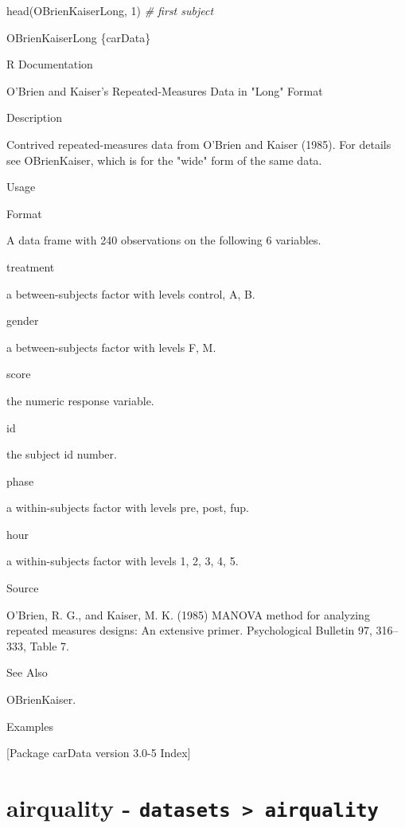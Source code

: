 \documentclass[
]{book}
\newenvironment{Shaded}{\begin{snugshade}}{\end{snugshade}}
\newcommand{\CommentTok}[1]{\textcolor[rgb]{0.56,0.35,0.01}{\textit{#1}}}
\newcommand{\DecValTok}[1]{\textcolor[rgb]{0.00,0.00,0.81}{#1}}
\newcommand{\FunctionTok}[1]{\textcolor[rgb]{0.00,0.00,0.00}{#1}}
\newcommand{\NormalTok}[1]{#1}
\begin{document}
\begin{Shaded}
\begin{Highlighting}[]
\FunctionTok{head}\NormalTok{(OBrienKaiserLong, }\DecValTok{1}\NormalTok{) }\CommentTok{\# first subject}
\end{Highlighting}
\end{Shaded}

OBrienKaiserLong \{carData\}

R Documentation

O'Brien and Kaiser's Repeated-Measures Data in "Long" Format

Description

Contrived repeated-measures data from O'Brien and Kaiser (1985). For details see OBrienKaiser, which is for the "wide" form of the same data.

Usage

Format

A data frame with 240 observations on the following 6 variables.

treatment

a between-subjects factor with levels control, A, B.

gender

a between-subjects factor with levels F, M.

score

the numeric response variable.

id

the subject id number.

phase

a within-subjects factor with levels pre, post, fup.

hour

a within-subjects factor with levels 1, 2, 3, 4, 5.

Source

O'Brien, R. G., and Kaiser, M. K. (1985)
MANOVA method for analyzing repeated measures designs: An extensive primer.
Psychological Bulletin 97, 316--333, Table 7.

See Also

OBrienKaiser.

Examples

{[}Package carData version 3.0-5 Index{]}

\hypertarget{airquality---datasets-airquality}{%
\section{\texorpdfstring{airquality - \texttt{datasets\ \textgreater{}\ airquality}}{airquality - datasets \textgreater{} airquality}}\label{airquality---datasets-airquality}}
\end{document}
